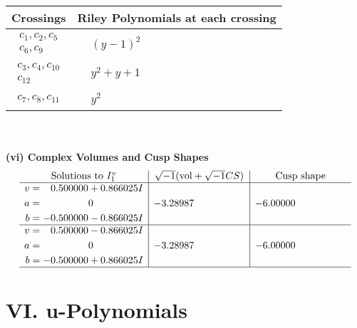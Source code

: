 \documentclass[1p]{elsarticle_modified}
\theoremstyle{definition}
\newcommand{\I}{\sqrt{-1}}
\begin{document}
\begin{tabular}{m{50pt}|m{274pt}}
Crossings & \hspace{64pt}Riley Polynomials at each crossing \\
\hline $$\begin{aligned}c_{1},c_{2},c_{5}\\c_{6},c_{9}\end{aligned}$$&$\begin{aligned}
&(y-1)^2
\end{aligned}$\\
\hline $$\begin{aligned}c_{3},c_{4},c_{10}\\c_{12}\end{aligned}$$&$\begin{aligned}
&y^2+y+1
\end{aligned}$\\
\hline $$\begin{aligned}c_{7},c_{8},c_{11}\end{aligned}$$&$\begin{aligned}
&y^2
\end{aligned}$\\
\hline
\end{tabular}\\~\\
\newpage\flushleft \textbf{(vi) Complex Volumes and Cusp Shapes}
$$\begin{array}{c|c|c}  
\text{Solutions to }I^v_{1}& \I (\text{vol} + \sqrt{-1}CS) & \text{Cusp shape}\\
 \hline 
\begin{aligned}
v &= \phantom{-}0.500000 + 0.866025 I \\
a &= \phantom{-0.000000 } 0 \\
b &= -0.500000 - 0.866025 I\end{aligned}
 & -3.28987\phantom{ +0.000000I} & -6.00000\phantom{ +0.000000I} \\ \hline\begin{aligned}
v &= \phantom{-}0.500000 - 0.866025 I \\
a &= \phantom{-0.000000 } 0 \\
b &= -0.500000 + 0.866025 I\end{aligned}
 & -3.28987\phantom{ +0.000000I} & -6.00000\phantom{ +0.000000I}\\
 \hline 
 \end{array}$$\newpage
\newpage\renewcommand{\arraystretch}{1}
\centering \section*{ VI. u-Polynomials}
\end{document}
